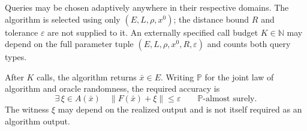 \documentclass[10pt]{article}
\theoremstyle{definition}
\begin{document}
Queries may be chosen adaptively anywhere in their respective domains. The algorithm is selected using only $(E,L,\rho,x^0)$; the distance bound $R$ and tolerance $\varepsilon$ are not supplied to it. An externally specified call budget $K\in\mathbb{N}$ may depend on the full parameter tuple $(E,L,\rho,x^0,R,\varepsilon)$ and counts both query types.

After $K$ calls, the algorithm returns $\bar{x}\in E$. Writing $\mathbb{P}$ for the joint law of algorithm and oracle randomness, the required accuracy is
\[
\exists\,\xi\in A(\bar{x})\quad
\|F(\bar{x})+\xi\|\leq\varepsilon
\qquad \mathbb{P}\text{-almost surely}.
\]
The witness $\xi$ may depend on the realized output and is not itself required as an algorithm output.
\end{document}

